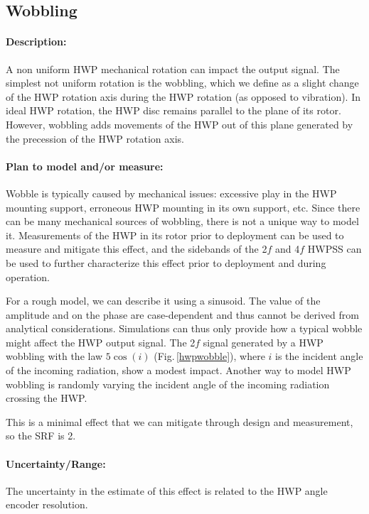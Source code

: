 \subsection{Wobbling}

\paragraph{Description:}
A non uniform HWP mechanical rotation can impact the output signal. The simplest not uniform rotation is the wobbling, which
we define as a slight change of the HWP rotation axis during the HWP rotation (as opposed to vibration). In ideal HWP rotation, the HWP disc remains parallel to the plane of its rotor. However, wobbling adds movements of the HWP out of this plane generated by the precession of the HWP rotation axis.

\paragraph{Plan to model and/or measure:}
Wobble is typically caused by mechanical issues: excessive play in the HWP mounting support, erroneous HWP mounting in its own support, etc. Since there can be many mechanical sources of wobbling, there is not a unique way to model it. Measurements of the HWP in its rotor prior to deployment can be used to measure and mitigate this effect, and the sidebands of the 2$f$ and 4$f$ HWPSS can be used to further characterize this effect prior to deployment and during operation.

For a rough model, we can describe it using a sinusoid. The value of the amplitude and on the phase are case-dependent and thus cannot be derived from analytical considerations. Simulations can thus only provide how a typical wobble might affect the HWP output signal. The 2$f$ signal generated by a HWP wobbling with the law $5\cos(i)$ (Fig.\,\ref{hwpwobble}), where $i$ is the incident angle of the incoming radiation, show a modest impact. Another way to model HWP wobbling is randomly varying the incident angle of the incoming radiation crossing the HWP.

This is a minimal effect that we can mitigate through design and measurement, so the SRF is 2.

\paragraph{Uncertainty/Range:}
The uncertainty in the estimate of this effect is related to the HWP angle encoder resolution.


